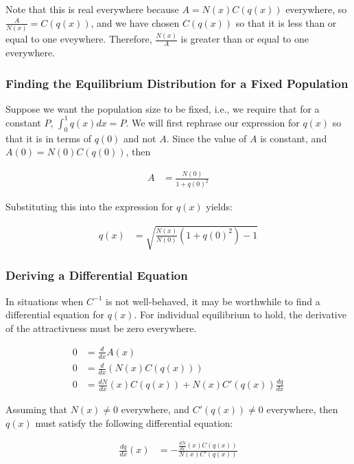 \documentclass{article}
\begin{document}
Note that this is real everywhere because $A = N(x) C(q(x))$ everywhere,
	so $\frac A {N(x)} = C(q(x))$, and we have chosen $C(q(x))$ so 
	that it is less than or equal to one eveywhere.
Therefore, $\frac {N(x)} A$ is greater than or equal to one everywhere.

\subsubsection{Finding the Equilibrium Distribution for a Fixed Population}

Suppose we want the population size to be fixed, i.e., we require
	that for a constant $P$, $\int_0^1 q(x) dx = P$.
We will first rephrase our expression for $q(x)$ so that it is in terms
	of $q(0)$ and not $A$.
Since the value of $A$ is constant, and $A(0) = N(0) C(q(0))$,
	then

\begin{align}
	A & = \frac{N(0)}{1 + q(0)^2}
\end{align}

Substituting this into the expression for $q(x)$ yields:

\begin{align}
	q(x) & = \sqrt{ \frac{N(x)}{N(0)} \left( 1 + q(0)^2 \right) - 1 }
\end{align}

\subsubsection{Deriving a Differential Equation}

In situations when $C^{-1}$ is not well-behaved, it may be worthwhile
	to find a differential equation for $q(x)$.
For individual equilibrium to hold, the derivative of the attractivness
	must be zero everywhere.

\begin{align}
	0 & = \frac d {dx} A(x) \nonumber \\
	0 & = \frac d {dx} \left(  N(x) C( q( x ) ) \right) \nonumber \\
	0 & = \frac {dN}{dx}(x) C( q(x) ) + N(x) C'(q(x))\frac {dq}{dx} \nonumber 
\end{align}

Assuming that $N(x) \neq 0$ everywhere, and $C'(q(x)) \neq 0$ everywhere,
	then $q(x)$ must satisfy the following differential equation:

\begin{align}
	\frac {dq}{dx}(x) 
		& = - \frac
			{ \frac {dN}{dx}(x) C( q(x) )}
			{ N(x) C'(q(x)) } \label{eq-dqdx-choice}
\end{align}
\end{document}
